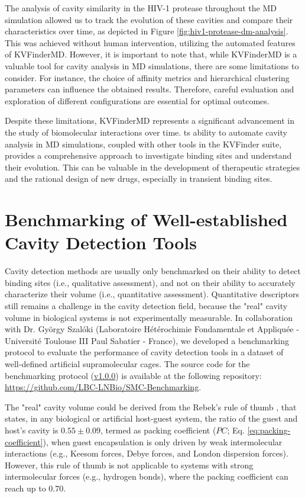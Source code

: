 \documentclass[Ingles]{phdthesis}
\def\ie{i.e.\onedot}
\def\eg{e.g.\onedot}
\begin{document}
The analysis of cavity similarity in the \acs{HIV-1} protease throughout the \acs{MD} simulation allowed us to track the evolution of these cavities and compare their characteristics over time, as depicted in Figure \ref{fig:hiv1-protease-dm-analysis}. This was achieved without human intervention, utilizing the automated features of KVFinderMD. However, it is important to note that, while KVFinderMD is a valuable tool for cavity analysis in \acs{MD} simulations, there are some limitations to consider. For instance, the choice of affinity metrics and hierarchical clustering parameters can influence the obtained results. Therefore, careful evaluation and exploration of different configurations are essential for optimal outcomes.

Despite these limitations, KVFinderMD represents a significant advancement in the study of biomolecular interactions over time. ts ability to automate cavity analysis in \acs{MD} simulations, coupled with other tools in the KVFinder suite, provides a comprehensive approach to investigate binding sites and understand their evolution. This can be valuable in the development of therapeutic strategies and the rational design of new drugs, especially in transient binding sites.

\section{Benchmarking of Well-established Cavity Detection Tools}

Cavity detection methods are usually only benchmarked on their ability to detect binding sites (\ie, qualitative assessment), and not on their ability to accurately characterize their volume (\ie, quantitative assessment). Quantitative descriptors still remains a challenge in the cavity detection field, because the "real" cavity volume in biological systems is not experimentally measurable. In collaboration with Dr. György Szalóki (Laboratoire Hétérochimie Fondamentale et Appliquée - Université Toulouse III Paul Sabatier - France), we developed a benchmarking protocol to evaluate the performance of cavity detection tools in a dataset of well-defined artificial supramolecular cages. The source code for the benchmarking protocol (\href{https://github.com/LBC-LNBio/SMC-Benchmarking/releases/tag/v1.0.0}{v1.0.0}) is available at the following repository: \url{https://github.com/LBC-LNBio/SMC-Benchmarking}.

The "real" cavity volume could be derived from the Rebek's rule of thumb \cite{mecozzi1998}, that states, in any biological or artificial host-guest system, the ratio of the guest and host's cavity is $0.55\pm0.09$, termed as packing  coefficient ($PC$; Eq. \ref{eq:packing-coefficient}), when guest encapsulation is only driven by weak intermolecular interactions (\eg, Keesom forces, Debye forces, and London dispersion forces). However, this rule of thumb is not applicable to systems with strong intermolecular forces (\eg, hydrogen bonds), where the packing coefficient can reach up to $0.70$. 
\end{document}
